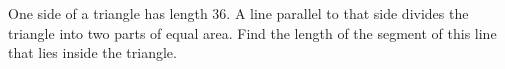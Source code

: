 One side of a triangle has length $36$. A line parallel to that side divides the triangle into two parts of equal area. Find the length of the segment of this line that lies inside the triangle.
